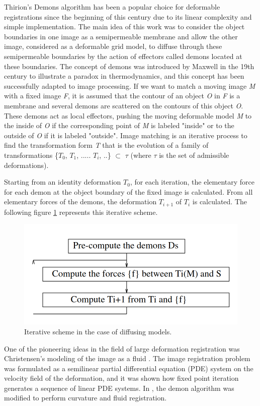 \documentclass{report}
\begin{document}
	Thirion's Demons algorithm \cite{THIRION1998243} has been a popular choice for deformable registrations since the beginning of this century due to its linear complexity and simple implementation. The main idea of this work was to consider the object boundaries in one image as a semipermeable membrane and allow the other image, considered as a deformable grid model, to diffuse through these semipermeable boundaries by the action of effectors called demons located at these boundaries. The concept of demons was introduced by Maxwell in the 19th century to illustrate a paradox in thermodynamics, and this concept has been successfully adapted to image processing. If we want to match a moving image \emph{M} with a fixed image \emph{F}, it is assumed that the contour of an object \emph{O} in \emph{F} is a membrane and several demons are scattered on the contours of this object \emph{O}. These demons act as local effectors, pushing the moving deformable model \emph{M} to the inside of \emph{O} if the corresponding point of \emph{M} is labeled "inside" or to the outside of \emph{O} if it is labeled "outside".
	Image matching is an iterative process to find the transformation form \emph{T} that is the  evolution of a family of transformations \{$T_0$, $T_1$, ..... $T_i$, ..\} $\subset$ $\tau$ (where $\tau$ is the set of admissible deformations).
	
	Starting from an identity deformation {$T_0$}, for each iteration, the elementary force for each demon at the object boundary of the fixed image is calculated. From all elementary forces of the demons, the deformation $T_{i+1}$ of $T_i$ is calculated. The following figure \ref{fig:demons} represents this iterative scheme.
	
	\begin{figure}[H]
		\centering
		\includegraphics[width=0.7\columnwidth]{resources/chapter2/demons.png}
		\caption{Iterative scheme in the case of diffusing models. \cite{THIRION1998243}}
		\label{fig:demons}
	\end{figure}
	
	One of the pioneering ideas in the field of large deformation registration was Christensen's modeling of the image as a fluid \cite{536892}. The image registration problem was formulated as a semilinear partial differential equation (PDE) system on the velocity field of the deformation, and it was shown how fixed point iteration generates a sequence of linear PDE systems. In \cite{5193151}, the demon algorithm was modified to perform curvature and fluid registration.
	
\end{document}
